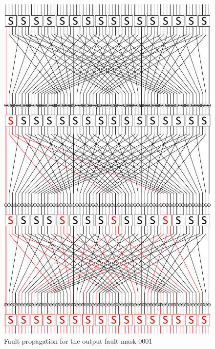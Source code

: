 \documentclass[10pt, conference, compsocconf]{IEEEtran}  %
\numberwithin{Definition}{section}
\numberwithin{Claim}{section}
\begin{document}
\begin{figure}
	\centering
	\includegraphics[width=0.9\linewidth]{present_fault_0001}
    \caption{Fault propagation for the output fault mask $0001$}
    \label{example_1}
\end{figure}
\end{document}
